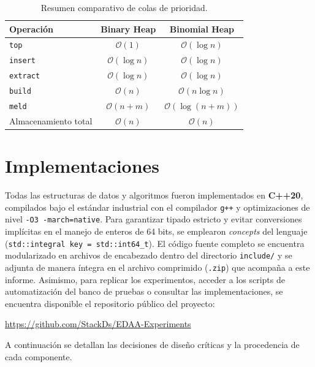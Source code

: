 \documentclass[11pt,letterpaper]{article}
\begin{document}
\begin{table}[htbp]
    \centering
    \caption{Resumen comparativo de colas de prioridad.}
    \label{tab:complejidades-heaps}
    \begin{tabular}{lcc}
        \hline
        \textbf{Operación} & \textbf{Binary Heap} & \textbf{Binomial Heap} \\
        \hline
        \texttt{top}     & $\mathcal{O}(1)$
                         & $\mathcal{O}(\log n)$ \\
        \texttt{insert}  & $\mathcal{O}(\log n)$
                         & $\mathcal{O}(\log n)$ \\
        \texttt{extract} & $\mathcal{O}(\log n)$
                         & $\mathcal{O}(\log n)$ \\
        \texttt{build}   & $\mathcal{O}(n)$
                         & $\mathcal{O}(n\log n)$ \\
        \texttt{meld}    & $\mathcal{O}(n+m)$
                         & $\mathcal{O}(\log(n+m))$ \\
        \hline
        Almacenamiento total & $\mathcal{O}(n)$
                             & $\mathcal{O}(n)$ \\
        \hline
    \end{tabular}
    \end{table}

\newpage

\section{Implementaciones}

Todas las estructuras de datos y algoritmos fueron implementados en \textbf{C++20}, compilados bajo el estándar industrial con el compilador \texttt{g++} y optimizaciones de nivel \texttt{-O3 -march=native}. Para garantizar tipado estricto y evitar conversiones implícitas en el manejo de enteros de 64 bits, se emplearon \textit{concepts} del lenguaje (\texttt{std::integral key = std::int64\_t}). 
El código fuente completo se encuentra modularizado en archivos de encabezado dentro del directorio \texttt{include/} y se adjunta de manera íntegra en el archivo comprimido (\texttt{.zip}) que acompaña a este informe. Asimismo, para replicar los experimentos, acceder a los scripts de automatización del banco de pruebas o consultar las implementaciones, se encuentra disponible el repositorio público del proyecto:
\begin{center}
\url{https://github.com/StackDs/EDAA-Experiments}
\end{center}
A continuación se detallan las decisiones de diseño críticas y la procedencia de cada componente.
\end{document}
